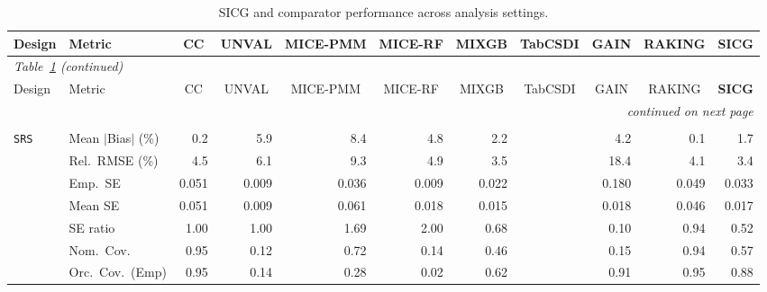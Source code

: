 \begin{landscape}
\footnotesize\setlength{\tabcolsep}{3.5pt}
\begin{longtable}{llrrrrrrrrr}
\caption{SICG and comparator performance across analysis settings.}
\label{tab:appc_surv_SampleOE} \\
\toprule
Design & Metric & \multicolumn{1}{c}{CC} & \multicolumn{1}{c}{UNVAL} & \multicolumn{1}{c}{MICE-PMM} & \multicolumn{1}{c}{MICE-RF} & \multicolumn{1}{c}{MIXGB} & \multicolumn{1}{c}{TabCSDI} & \multicolumn{1}{c}{GAIN} & \multicolumn{1}{c}{RAKING} & \multicolumn{1}{c}{\textbf{SICG}} \\
\midrule \endfirsthead
\multicolumn{11}{l}{\footnotesize\itshape Table~\ref{tab:appc_surv_SampleOE} (continued)} \\
\toprule
Design & Metric & \multicolumn{1}{c}{CC} & \multicolumn{1}{c}{UNVAL} & \multicolumn{1}{c}{MICE-PMM} & \multicolumn{1}{c}{MICE-RF} & \multicolumn{1}{c}{MIXGB} & \multicolumn{1}{c}{TabCSDI} & \multicolumn{1}{c}{GAIN} & \multicolumn{1}{c}{RAKING} & \multicolumn{1}{c}{\textbf{SICG}} \\
\midrule \endhead
\midrule \multicolumn{11}{r}{\footnotesize\itshape continued on next page} \\
\endfoot
\bottomrule \endlastfoot
\multicolumn{11}{l}{\textbf{Continuous Phase-Two Covariates}} \\
\addlinespace[2pt]
\quad \texttt{SRS} & Mean $|$Bias$|$ (\%) & \cellcolor{ranktwo}0.2 & 5.9 & 8.4 & 4.8 & 2.2 &  & 4.2 & \cellcolor{rankone}0.1 & \cellcolor{rankthree}1.7 \\
 & Rel.\ RMSE (\%) & 4.5 & 6.1 & 9.3 & 4.9 & \cellcolor{ranktwo}3.5 &  & 18.4 & \cellcolor{rankthree}4.1 & \cellcolor{rankone}3.4 \\
 & Emp.\ SE & 0.051 & 0.009 & 0.036 & 0.009 & 0.022 &  & 0.180 & 0.049 & 0.033 \\
 & Mean SE & 0.051 & 0.009 & 0.061 & 0.018 & 0.015 &  & 0.018 & 0.046 & 0.017 \\
 & SE ratio & \cellcolor{rankone}1.00 & \cellcolor{rankone}1.00 & 1.69 & 2.00 & \cellcolor{rankthree}0.68 &  & 0.10 & \cellcolor{ranktwo}0.94 & 0.52 \\
 & Nom.\ Cov. & \cellcolor{rankone}0.95 & 0.12 & \cellcolor{rankthree}0.72 & 0.14 & 0.46 &  & 0.15 & \cellcolor{ranktwo}0.94 & 0.57 \\
 & Orc.\ Cov.\ (Emp) & \cellcolor{rankone}0.95 & 0.14 & 0.28 & 0.02 & 0.62 &  & \cellcolor{ranktwo}0.91 & \cellcolor{rankone}0.95 & \cellcolor{rankthree}0.88 \\

\end{longtable}
\end{landscape}
